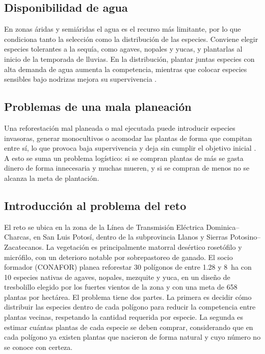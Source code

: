 \subsection{Disponibilidad de agua}
En zonas áridas y semiáridas el agua es el recurso más limitante, por lo que condiciona tanto la selección como la distribución de las especies. Conviene elegir especies tolerantes a la sequía, como agaves, nopales y yucas, y plantarlas al inicio de la temporada de lluvias. En la distribución, plantar juntas especies con alta demanda de agua aumenta la competencia, mientras que colocar especies sensibles bajo nodrizas mejora su supervivencia \autocite{padilla2006}.
 
\subsection{Problemas de una mala planeación}
Una reforestación mal planeada o mal ejecutada puede introducir especies invasoras, generar monocultivos o acomodar las plantas de forma que compitan entre sí, lo que provoca baja supervivencia y deja sin cumplir el objetivo inicial \autocite{conafor2010,holl2011}. A esto se suma un problema logístico: si se compran plantas de más se gasta dinero de forma innecesaria y muchas mueren, y si se compran de menos no se alcanza la meta de plantación.
 
\subsection{Introducción al problema del reto}
El reto se ubica en la zona de la Línea de Transmisión Eléctrica Dominica--Charcas, en San Luis Potosí, dentro de la subprovincia Llanos y Sierras Potosino--Zacatecanos. La vegetación es principalmente matorral desértico rosetófilo y micrófilo, con un deterioro notable por sobrepastoreo de ganado. El socio formador (CONAFOR) planea reforestar 30 polígonos de entre 1.28 y 8~ha con 10 especies nativas de agaves, nopales, mezquite y yuca, en un diseño de tresbolillo elegido por los fuertes vientos de la zona y con una meta de 658 plantas por hectárea.
El problema tiene dos partes. La primera es decidir cómo distribuir las especies dentro de cada polígono para reducir la competencia entre plantas vecinas, respetando la cantidad requerida por especie. La segunda es estimar cuántas plantas de cada especie se deben comprar, considerando que en cada polígono ya existen plantas que nacieron de forma natural y cuyo número no se conoce con certeza.
 
